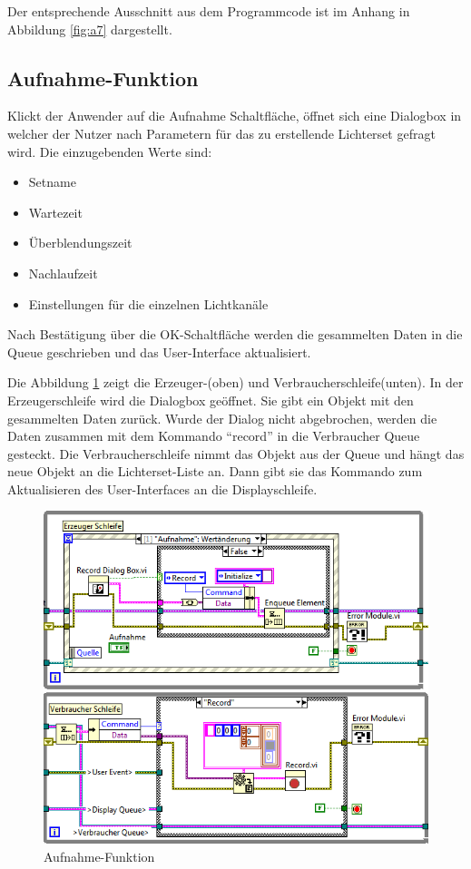 Der entsprechende Ausschnitt aus dem Programmcode ist im Anhang in Abbildung \ref{fig:a7} dargestellt.


\subsection{Aufnahme-Funktion}	
Klickt der Anwender auf die Aufnahme Schaltfläche, öffnet sich eine Dialogbox in welcher der Nutzer nach Parametern für das zu erstellende Lichterset gefragt wird. 
Die einzugebenden Werte sind:
\begin{itemize}
\item Setname
\item Wartezeit
\item Überblendungszeit
\item Nachlaufzeit
\item Einstellungen für die einzelnen Lichtkanäle
\end{itemize}

Nach Bestätigung über die OK-Schaltfläche werden die gesammelten Daten in die Queue geschrieben und das User-Interface aktualisiert. 

Die Abbildung \ref{fig:rec} zeigt die Erzeuger-(oben) und Verbraucherschleife(unten). In der Erzeugerschleife wird die Dialogbox geöffnet. 
Sie gibt ein Objekt mit den gesammelten Daten zurück. 
Wurde der Dialog nicht abgebrochen, werden die Daten zusammen mit dem Kommando "`record"' in die Verbraucher Queue gesteckt. 
Die Verbraucherschleife nimmt  das Objekt aus der Queue und hängt das neue Objekt an die Lichterset-Liste an. 
Dann gibt sie das Kommando zum Aktualisieren des User-Interfaces an die Displayschleife.

	\begin{figure}[!ht]
	\centering
		\includegraphics[width=\textwidth]{Pics/record.png}
	\caption{Aufnahme-Funktion}
	\label{fig:rec}
	\end{figure}
	
